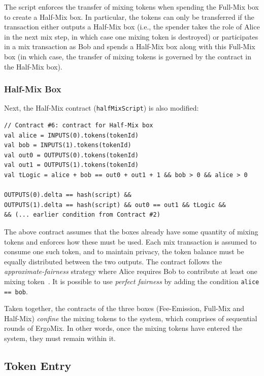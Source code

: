 \documentclass[runningheads]{llncs}
\newcommand{\mixname}{ErgoMix\xspace}
\begin{document}
The script enforces the transfer of mixing tokens when spending the Full-Mix box to create a Half-Mix box. In particular, the tokens can only be transferred if the transaction either outputs a Half-Mix box (i.e., the spender takes the role of Alice in the next mix step, in which case one mixing token is destroyed) or participates in a mix transaction as Bob and spends a Half-Mix box along with this Full-Mix box (in which case, the transfer of mixing tokens is governed by the contract in the Half-Mix box).

\subsubsection{Half-Mix Box}
Next, the Half-Mix contract (\texttt{halfMixScript}) is also modified:
{\small
\begin{Verbatim}[frame=single]
// Contract #6: contract for Half-Mix box
val alice = INPUTS(0).tokens(tokenId)
val bob = INPUTS(1).tokens(tokenId)
val out0 = OUTPUTS(0).tokens(tokenId)
val out1 = OUTPUTS(1).tokens(tokenId)
val tLogic = alice + bob == out0 + out1 + 1 && bob > 0 && alice > 0 
  
OUTPUTS(0).delta == hash(script) && 
OUTPUTS(1).delta == hash(script) && out0 == out1 && tLogic &&
&& (... earlier condition from Contract #2)
\end{Verbatim}
}

The above contract assumes that the boxes already have some quantity of mixing tokens and enforces how these must be used. Each mix transaction is assumed to consume one such token, and to maintain privacy, the token balance must be equally distributed between the two outputs. The contract follows the {\em approximate-fairness} strategy where Alice requires Bob to contribute at least one mixing token~\cite{advtutorial}. It is possible to use {\em perfect fairness} by adding the condition \texttt{alice == bob}. 

Taken together, the contracts of the three boxes (Fee-Emission, Full-Mix and Half-Mix) {\em confine} the mixing tokens to the system, which comprises of sequential rounds of \mixname. In other words, once the mixing tokens have entered the system, they must remain within it. 

\subsection{Token Entry}
\end{document}
